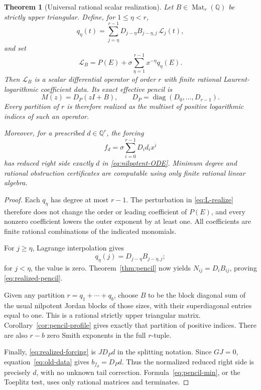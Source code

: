 \documentclass[11pt,a4paper]{article}
\numberwithin{equation}{section}
\newtheorem{theorem}{Theorem}[section]
\theoremstyle{definition}
\theoremstyle{remark}
\theoremstyle{definition}
\newcommand{\Q}{\mathbb Q}
\newcommand{\Ll}{\mathcal L}
\newcommand{\diag}{\operatorname{diag}}
\newcommand{\Mat}{\operatorname{Mat}}
\begin{document}
\begin{theorem}[Universal rational scalar realization]
\label{thm:realization}
Let $B\in\Mat_r(\Q)$ be strictly upper triangular. Define, for $1\le\eta<r$,
\begin{equation}
 q_\eta(t)=\sum_{j=\eta}^{r-1}
 D_{j-\eta}B_{j-\eta,j}\,\mathcal L_j(t),
 \label{eq:q-realize}
\end{equation}
and set
\begin{equation}
 \Ll_B=P(E)+\sigma\sum_{\eta=1}^{r-1}x^{-\eta}q_\eta(E).
 \label{eq:L-realize}
\end{equation}
Then $\Ll_B$ is a scalar differential operator of order $r$ with finite rational Laurent-logarithmic coefficient data. Its exact effective pencil is
\begin{equation}
 M(z)=D_P(zI+B),\qquad D_P=\diag(D_0,\ldots,D_{r-1}).
 \label{eq:realized-pencil}
\end{equation}
Every partition of $r$ is therefore realized as the multiset of positive logarithmic indices of such an operator.

Moreover, for a prescribed $d\in\Q^r$, the forcing
\begin{equation}
 f_d=\sigma\sum_{i=0}^{r-1}D_i d_i x^i
 \label{eq:realized-forcing}
\end{equation}
has reduced right side exactly $d$ in \eqref{eq:nilpotent-ODE}. Minimum degree and rational obstruction certificates are computable using only finite rational linear algebra.
\end{theorem}
\begin{proof}
Each $q_\eta$ has degree at most $r-1$. The perturbation in \eqref{eq:L-realize} therefore does not change the order or leading coefficient of $P(E)$, and every nonzero coefficient lowers the outer exponent by at least one. All coefficients are finite rational combinations of the indicated monomials.

For $j\ge\eta$, Lagrange interpolation gives
\[
 q_\eta(j)=D_{j-\eta}B_{j-\eta,j};
\]
for $j<\eta$, the value is zero. Theorem~\ref{thm:pencil} now yields $N_{ij}=D_iB_{ij}$, proving \eqref{eq:realized-pencil}.

Given any partition $r=q_1+\cdots+q_b$, choose $B$ to be the block diagonal sum of the usual nilpotent Jordan blocks of those sizes, with their superdiagonal entries equal to one. This is a rational strictly upper triangular matrix. Corollary~\ref{cor:pencil-profile} gives exactly that partition of positive indices. There are also $r-b$ zero Smith exponents in the full $r$-tuple.

Finally, \eqref{eq:realized-forcing} is $JD_Pd$ in the splitting notation. Since $GJ=0$, equation~\eqref{eq:old-data} gives $b_{f_d}=D_Pd$. Thus the normalized reduced right side is precisely $d$, with no unknown tail correction. Formula~\eqref{eq:pencil-min}, or the Toeplitz test, uses only rational matrices and terminates.
\end{proof}
\end{document}
